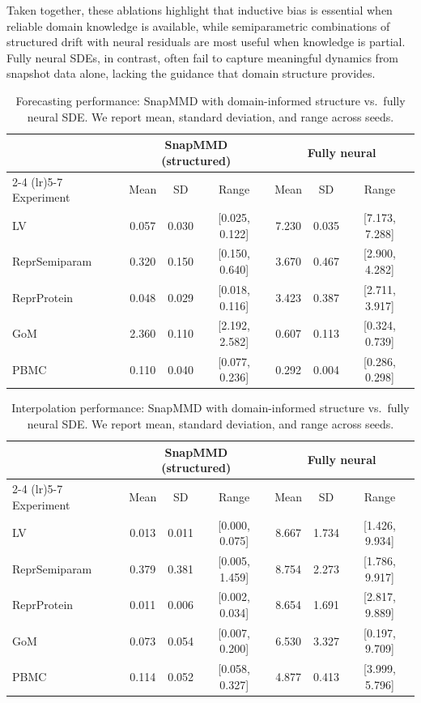 Taken together, these ablations highlight that inductive bias is essential when reliable domain knowledge is available, while semiparametric combinations of structured drift with neural residuals are most useful when knowledge is partial. Fully neural SDEs, in contrast, often fail to capture meaningful dynamics from snapshot data alone, lacking the guidance that domain structure provides.
 
\begin{table}[ht]
\centering
\caption{Forecasting performance: SnapMMD with domain-informed structure vs.\ fully neural SDE. 
We report mean, standard deviation, and range across seeds.}
\label{tab:abl-neural-forecast}
\begin{tabular}{lcccccc}
\toprule
& \multicolumn{3}{c}{SnapMMD (structured)} & \multicolumn{3}{c}{Fully neural} \\
\cmidrule(lr){2-4} \cmidrule(lr){5-7}
Experiment & Mean & SD & Range & Mean & SD & Range \\
\midrule
LV & 0.057 & 0.030 & [0.025, 0.122] & 7.230 & 0.035 & [7.173, 7.288] \\
ReprSemiparam & 0.320 & 0.150 & [0.150, 0.640] & 3.670 & 0.467 & [2.900, 4.282] \\
ReprProtein & 0.048 & 0.029 & [0.018, 0.116] & 3.423 & 0.387 & [2.711, 3.917] \\
GoM & 2.360 & 0.110 & [2.192, 2.582] & 0.607 & 0.113 & [0.324, 0.739] \\
PBMC & 0.110 & 0.040 & [0.077, 0.236] & 0.292 & 0.004 & [0.286, 0.298] \\
\bottomrule
\end{tabular}
\end{table}



\begin{table}[ht]
\centering
\caption{Interpolation performance: SnapMMD with domain-informed structure vs.\ fully neural SDE. 
We report mean, standard deviation, and range across seeds.}
\label{tab:abl-neural-interp}
\begin{tabular}{lcccccc}
\toprule
& \multicolumn{3}{c}{SnapMMD (structured)} & \multicolumn{3}{c}{Fully neural} \\
\cmidrule(lr){2-4} \cmidrule(lr){5-7}
Experiment & Mean & SD & Range & Mean & SD & Range \\
\midrule
LV & 0.013 & 0.011 & [0.000, 0.075] & 8.667 & 1.734 & [1.426, 9.934] \\
ReprSemiparam & 0.379 & 0.381 & [0.005, 1.459] & 8.754 & 2.273 & [1.786, 9.917] \\
ReprProtein & 0.011 & 0.006 & [0.002, 0.034] & 8.654 & 1.691 & [2.817, 9.889] \\
GoM & 0.073 & 0.054 & [0.007, 0.200] & 6.530 & 3.327 & [0.197, 9.709] \\
PBMC & 0.114 & 0.052 & [0.058, 0.327] & 4.877 & 0.413 & [3.999, 5.796] \\
\bottomrule
\end{tabular}
\end{table}




